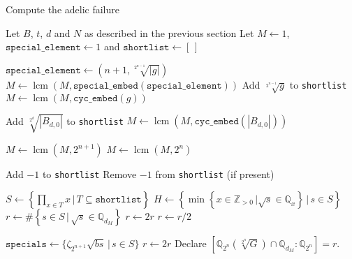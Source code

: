 \documentclass[10pt,a4paper]{article}
\DeclareMathOperator{\lcm}{lcm}
\theoremstyle{definition}
\begin{document}
\begin{algorithm}
\caption{Compute the adelic failure}
\begin{algorithmic}
\State Let $B$, $t$, $d$ and $N$ as described in the previous section
\State Let $M\leftarrow1$, $\texttt{special\_element}\leftarrow1$ and $\texttt{shortlist}\leftarrow[\,]$

\State

\State $\texttt{special\_element}\leftarrow(n+1,\sqrt[2^{n-1}]{|g|})$
\State $M\leftarrow\lcm(M,\texttt{special\_embed}(\texttt{special\_element}))$
\Else 
\State Add $\sqrt[2^{n-1}]{g}$ to \texttt{shortlist}
\State $M\leftarrow\lcm(M,\texttt{cyc\_embed}(g))$
\EndIf
\EndFor
\EndIf

\State

\State Add $\sqrt[2^{d}]{|B_{d,0}|}$ to \texttt{shortlist}
\State $M\leftarrow\lcm(M,\texttt{cyc\_embed}(|B_{d,0}|))$
\EndIf

\State
{}
\State $M\leftarrow\lcm(M,2^{n+1})$
\Else
\State $M\leftarrow\lcm(M,2^n)$
\EndIf
\State

\State Add $-1$ to \texttt{shortlist}
\EndIf
\State
{}
\State Remove $-1$ from \texttt{shortlist} (if present)
\EndIf
\State
{}
\end{algorithmic}
\end{algorithm}
\pagebreak

\begin{algorithm}
\begin{algorithmic}
\State $S\leftarrow\left\{\prod_{x\in T}x\,|\,T\subseteq\texttt{shortlist}\right\}$
\State $H\leftarrow\left\{\min\left\{x\in\mathbb{Z}_{>0}\,|\sqrt{s}\in \mathbb{Q}_x\right\}\,|\,s\in S\right\}$
\State $r\leftarrow\# \left\{s\in S\,|\, \sqrt{s}\in\mathbb{Q}_{d_M}\right\}$
\State
{}
\State $r\leftarrow 2r$
\EndIf
\State
{}
\State $r\leftarrow r/2$
\EndIf
\State

\State $\texttt{specials}\leftarrow\{\zeta_{2^{n+1}}\sqrt{bs}\,|\,s\in S\}$
\State $r\leftarrow 2r$
\EndIf
\EndIf
\State
\State Declare $\left[\mathbb{Q}_{2^n}\left(\sqrt[2^n]{G}\right)\cap \mathbb{Q}_{d_M}:\mathbb{Q}_{2^n}\right]=r$.

\EndFor
\EndFor
\end{algorithmic}
\end{algorithm}
\end{document}
